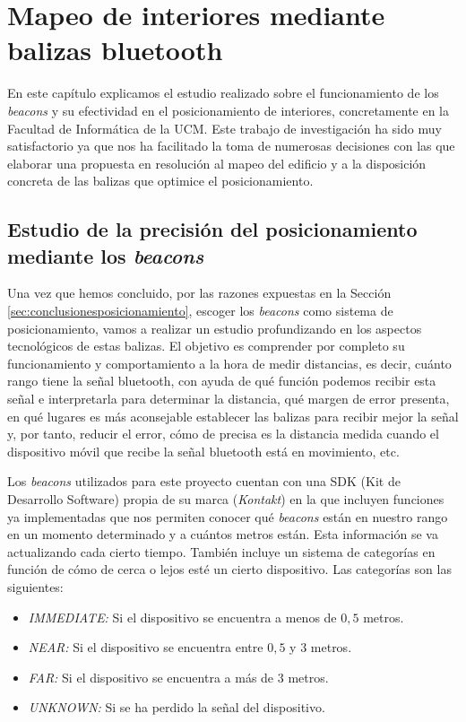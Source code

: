 \chapter{Mapeo de interiores mediante balizas bluetooth}
\label{cap:descripcionTrabajo}

En este capítulo explicamos el estudio realizado sobre el funcionamiento de los \textit{beacons} y su efectividad en el posicionamiento de interiores, concretamente en la Facultad de Informática de la UCM. Este trabajo de investigación ha sido muy satisfactorio ya que nos ha facilitado la toma de numerosas decisiones con las que elaborar una propuesta en resolución al mapeo del edificio y a la disposición concreta de las balizas que optimice el posicionamiento. 

\section{Estudio de la precisión del posicionamiento mediante los \textit{beacons}}

Una vez que hemos concluido, por las razones expuestas en la Sección \ref{sec:conclusionesposicionamiento}, escoger los \textit{beacons} como sistema de posicionamiento, vamos a realizar un estudio profundizando en los aspectos tecnológicos de estas balizas. El objetivo es comprender por completo su funcionamiento y comportamiento a la hora de medir distancias, es decir, cuánto rango tiene la señal bluetooth, con ayuda de qué función podemos recibir esta señal e interpretarla para determinar la distancia, qué margen de error presenta, en qué lugares es más aconsejable establecer las balizas para recibir mejor la señal y, por tanto, reducir el error, cómo de precisa es la distancia medida cuando el dispositivo móvil que recibe la señal bluetooth está en movimiento, etc. 

Los \textit{beacons} utilizados para este proyecto cuentan con una SDK (Kit de Desarrollo Software) propia de su marca (\textit{Kontakt}) en la que incluyen funciones ya implementadas que nos permiten conocer qué \textit{beacons} están en nuestro rango en un momento determinado y a cuántos metros están. Esta información se va actualizando cada cierto tiempo. También incluye un sistema de categorías en función de cómo de cerca o lejos esté un cierto dispositivo. Las categorías son las siguientes:

\begin{itemize}
	\item \textit{IMMEDIATE:} Si el dispositivo se encuentra a menos de $0,5$ metros.
	\item \textit{NEAR:} Si el dispositivo se encuentra entre $0,5$ y $3$ metros.
	\item \textit{FAR:} Si el dispositivo se encuentra a más de $3$ metros.
	\item \textit{UNKNOWN:} Si se ha perdido la señal del dispositivo.
\end{itemize}

